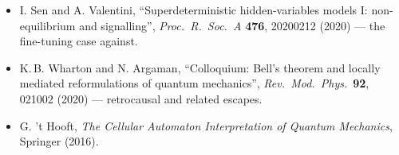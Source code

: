 \documentclass[11pt,a4paper]{article}
\theoremstyle{remark}
\begin{document}
\begin{itemize}[nosep]
        ``Cosmic Bell test using random measurement settings from high-redshift
        quasars'', \emph{Phys.\ Rev.\ Lett.}\ \textbf{121}, 080403 (2018).
  \item I. Sen and A. Valentini, ``Superdeterministic hidden-variables models
        I: non-equilibrium and signalling'', \emph{Proc.\ R.\ Soc.\ A}
        \textbf{476}, 20200212 (2020) --- the fine-tuning case against.
  \item K.\,B. Wharton and N. Argaman, ``Colloquium: Bell's theorem and locally
        mediated reformulations of quantum mechanics'', \emph{Rev.\ Mod.\ Phys.}\
        \textbf{92}, 021002 (2020) --- retrocausal and related escapes.
  \item G. 't Hooft, \emph{The Cellular Automaton Interpretation of Quantum
        Mechanics}, Springer (2016).
\end{itemize}
\end{document}
